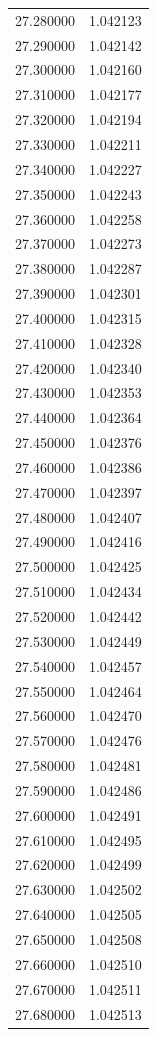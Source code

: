 \begin{tabular}{rr}
27.280000 & 1.042123 \\
27.290000 & 1.042142 \\
27.300000 & 1.042160 \\
27.310000 & 1.042177 \\
27.320000 & 1.042194 \\
27.330000 & 1.042211 \\
27.340000 & 1.042227 \\
27.350000 & 1.042243 \\
27.360000 & 1.042258 \\
27.370000 & 1.042273 \\
27.380000 & 1.042287 \\
27.390000 & 1.042301 \\
27.400000 & 1.042315 \\
27.410000 & 1.042328 \\
27.420000 & 1.042340 \\
27.430000 & 1.042353 \\
27.440000 & 1.042364 \\
27.450000 & 1.042376 \\
27.460000 & 1.042386 \\
27.470000 & 1.042397 \\
27.480000 & 1.042407 \\
27.490000 & 1.042416 \\
27.500000 & 1.042425 \\
27.510000 & 1.042434 \\
27.520000 & 1.042442 \\
27.530000 & 1.042449 \\
27.540000 & 1.042457 \\
27.550000 & 1.042464 \\
27.560000 & 1.042470 \\
27.570000 & 1.042476 \\
27.580000 & 1.042481 \\
27.590000 & 1.042486 \\
27.600000 & 1.042491 \\
27.610000 & 1.042495 \\
27.620000 & 1.042499 \\
27.630000 & 1.042502 \\
27.640000 & 1.042505 \\
27.650000 & 1.042508 \\
27.660000 & 1.042510 \\
27.670000 & 1.042511 \\
27.680000 & 1.042513 \\

\end{tabular}
